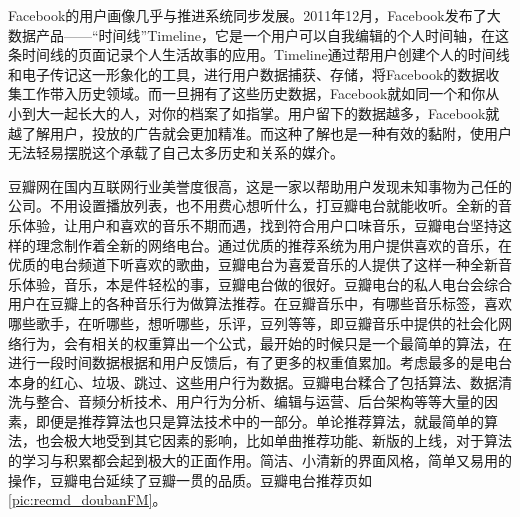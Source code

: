 		Facebook的用户画像几乎与推进系统同步发展。2011年12月，Facebook发布了大数据产品——“时间线”Timeline，它是一个用户可以自我编辑的个人时间轴，在这条时间线的页面记录个人生活故事的应用。Timeline通过帮用户创建个人的时间线和电子传记这一形象化的工具，进行用户数据捕获、存储，将Facebook的数据收集工作带入历史领域。而一旦拥有了这些历史数据，Facebook就如同一个和你从小到大一起长大的人，对你的档案了如指掌。用户留下的数据越多，Facebook就越了解用户，投放的广告就会更加精准。而这种了解也是一种有效的黏附，使用户无法轻易摆脱这个承载了自己太多历史和关系的媒介。

		豆瓣网在国内互联网行业美誉度很高，这是一家以帮助用户发现未知事物为己任的公司\citep{recmd-douban}。不用设置播放列表，也不用费心想听什么，打豆瓣电台就能收听。全新的音乐体验，让用户和喜欢的音乐不期而遇，找到符合用户口味音乐，豆瓣电台坚持这样的理念制作着全新的网络电台。通过优质的推荐系统为用户提供喜欢的音乐，在优质的电台频道下听喜欢的歌曲，豆瓣电台为喜爱音乐的人提供了这样一种全新音乐体验，音乐，本是件轻松的事，豆瓣电台做的很好。豆瓣电台的私人电台会综合用户在豆瓣上的各种音乐行为做算法推荐\citep{recmd-doubanFM}。在豆瓣音乐中，有哪些音乐标签，喜欢哪些歌手，在听哪些，想听哪些，乐评，豆列等等，即豆瓣音乐中提供的社会化网络行为，会有相关的权重算出一个公式，最开始的时候只是一个最简单的算法，在进行一段时间数据根据和用户反馈后，有了更多的权重值累加。考虑最多的是电台本身的红心、垃圾、跳过、这些用户行为数据。豆瓣电台糅合了包括算法、数据清洗与整合、音频分析技术、用户行为分析、编辑与运营、后台架构等等大量的因素，即便是推荐算法也只是算法技术中的一部分。单论推荐算法，就最简单的算法，也会极大地受到其它因素的影响，比如单曲推荐功能、新版的上线，对于算法的学习与积累都会起到极大的正面作用。简洁、小清新的界面风格，简单又易用的操作，豆瓣电台延续了豆瓣一贯的品质。豆瓣电台推荐页如\autoref{pic:recmd_doubanFM}。


